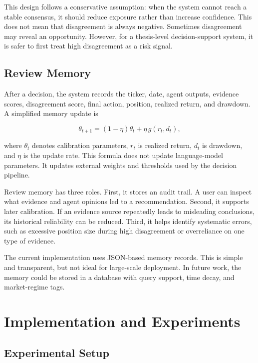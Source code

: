 \documentclass[14pt,a4paper]{extarticle}
\begin{document}
This design follows a conservative assumption: when the system cannot reach a stable consensus, it should reduce exposure rather than increase confidence. This does not mean that disagreement is always negative. Sometimes disagreement may reveal an opportunity. However, for a thesis-level decision-support system, it is safer to first treat high disagreement as a risk signal.

\subsection{Review Memory}

After a decision, the system records the ticker, date, agent outputs, evidence scores, disagreement score, final action, position, realized return, and drawdown. A simplified memory update is

\begin{equation}
\theta_{t+1}=(1-\eta)\theta_t+\eta\,g(r_t,d_t),
\label{eq:memory-update}
\end{equation}

where $\theta_t$ denotes calibration parameters, $r_t$ is realized return, $d_t$ is drawdown, and $\eta$ is the update rate. This formula does not update language-model parameters. It updates external weights and thresholds used by the decision pipeline.

Review memory has three roles. First, it stores an audit trail. A user can inspect what evidence and agent opinions led to a recommendation. Second, it supports later calibration. If an evidence source repeatedly leads to misleading conclusions, its historical reliability can be reduced. Third, it helps identify systematic errors, such as excessive position size during high disagreement or overreliance on one type of evidence.

The current implementation uses JSON-based memory records. This is simple and transparent, but not ideal for large-scale deployment. In future work, the memory could be stored in a database with query support, time decay, and market-regime tags.

\section{Implementation and Experiments}

\subsection{Experimental Setup}
\end{document}
